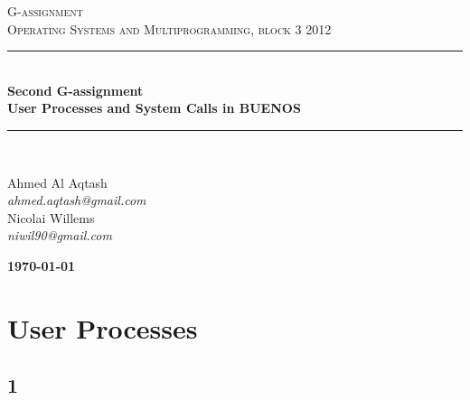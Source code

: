 \documentclass[10pt]{article}
\newcommand{\HRule}{\rule{\linewidth}{0.5mm}}
\begin{document}
\begin{titlepage}

\begin{center}



\textsc{\LARGE G-assignment}\\[1.5cm]

\textsc{\Large Operating Systems and Multiprogramming, block 3 2012}\\[0.5cm]


\HRule \\[0.4cm]

{ \bfseries Second G-assignment \\ User Processes and System Calls in BUENOS}\\[1cm]


\HRule \\ [7.5cm]


\begin{minipage}{0.5\textwidth}
\begin{flushleft} \large
Ahmed Al Aqtash \\
\textit{ahmed.aqtash@gmail.com}\\
Nicolai Willems \\
\textit{niwil90@gmail.com}\\
\end{flushleft}
\end{minipage}
\begin{minipage}{0.4\textwidth}
\begin{flushright} \large
\textbf{\today} \\
\end{flushright}
\end{minipage}

\vfill



\end{center}

\end{titlepage}


\newpage
\tableofcontents
\newpage
\section{User Processes}
\subsection*{1}
\end{document}
